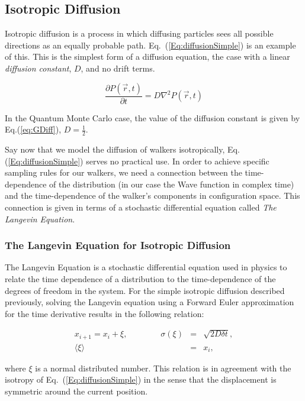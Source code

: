 \subsection{Isotropic Diffusion}

Isotropic diffusion is a process in which diffusing particles sees all possible directions as an equally probable path. Eq.~(\ref{Eq:diffusionSimple}) is an example of this. This is the simplest form of a diffusion equation, the case with a linear \textit{diffusion constant}, $D$, and no drift terms.

\begin{equation}
 \label{Eq:diffusionSimple}
 \frac{\partial P(\vec r, t)}{\partial t} = D\nabla^2 P(\vec r, t) 
\end{equation}

In the Quantum Monte Carlo case, the value of the diffusion constant is given by Eq.(\ref{eq:GDiff}), $D=\frac{1}{2}$. 

Say now that we model the diffusion of walkers isotropically, Eq.(\ref{Eq:diffusionSimple}) serves no practical use. In order to achieve specific sampling rules for our walkers, we need a connection between the time-dependence of the distribution (in our case the Wave function in complex time) and the time-dependence of the walker's components in configuration space. This connection is given in terms of a stochastic differential equation called \textit{The Langevin Equation}.

\subsubsection{The Langevin Equation for Isotropic Diffusion}

The Langevin Equation is a stochastic differential equation used in physics to relate the time dependence of a distribution to the time-dependence of the degrees of freedom in the system. For the simple isotropic diffusion described previously, solving the Langevin equation using a Forward Euler approximation for the time derivative results in the following relation:

\begin{eqnarray}
\label{eq:langevinSolSimple}
 x_{i+1} = x_i + \xi, \qquad\qquad \sigma(\xi) &=& \sqrt{2D\delta t}, \\
			     \langle\xi\rangle &=& x_i, \nonumber 
\end{eqnarray}

where $\xi$ is a normal distributed number. This relation is in agreement with the isotropy of Eq.~(\ref{Eq:diffusionSimple}) in the sense that the displacement is symmetric around the current position.



